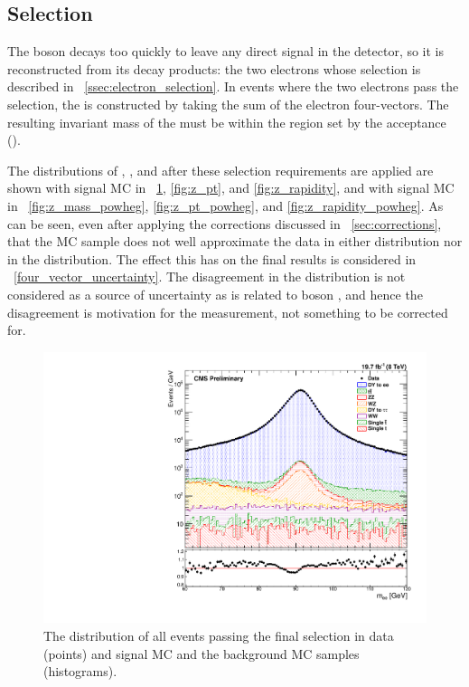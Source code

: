 \subsection{\Z Selection}

The \Z boson decays too quickly to leave any direct signal in the detector, so
it is reconstructed from its decay products: the two electrons whose selection
is described in \SEC~\ref{ssec:electron_selection}. In events where the two
electrons pass the selection, the \Z is constructed by taking the sum of the
electron four-vectors. The resulting invariant mass of the \Z must be within
the region set by the acceptance (\MassRange).

The distributions of \mee, \Z \pt, and \Z \rapidity after these selection
requirements are applied are shown with \MADGRAPH signal MC in
\FIGS~\ref{fig:z_mass}, \ref{fig:z_pt}, and \ref{fig:z_rapidity}, and with
\POWHEG signal MC in \FIGS~\ref{fig:z_mass_powheg}, \ref{fig:z_pt_powheg}, and
\ref{fig:z_rapidity_powheg}. As can be seen, even after applying the
corrections discussed in \SEC~\ref{sec:corrections}, that the \MADGRAPH MC
sample does not well approximate the data in either \mee distribution nor in
the \Z \rapidity distribution. The effect this has on the final results is
considered in \SEC~\ref{four_vector_uncertainty}. The disagreement in the \Z
\pt distribution is not considered as a source of uncertainty as \phistar is
related to boson \pt, and hence the disagreement is motivation for the
measurement, not something to be corrected for.

\begin{figure}[!htbp]
    \centering
    \includegraphics[width=\textwidth]{figures/z_mass_fine.pdf}
    \caption[
        The \mee distribution of events in data and MC with \MADGRAPH signal MC.
    ]{
        The \mee distribution of all events passing the final selection in data
        (points) and \MADGRAPH signal MC and the background MC samples
        (histograms).
    }
    \label{fig:z_mass}
\end{figure}

